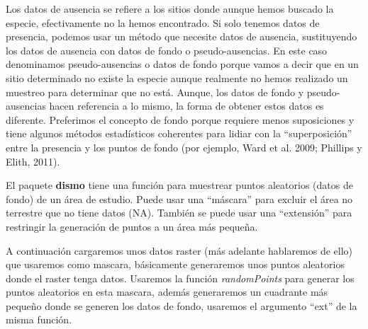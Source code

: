\documentclass[]{article}
\begin{document}
Los datos de ausencia se refiere a los sitios donde aunque hemos buscado
la especie, efectivamente no la hemos encontrado. Si solo tenemos datos
de presencia, podemos usar un método que necesite datos de ausencia,
sustituyendo los datos de ausencia con datos de fondo o
pseudo-ausencias. En este caso denominamos pseudo-ausencias o datos de
fondo porque vamos a decir que en un sitio determinado no existe la
especie aunque realmente no hemos realizado un muestreo para determinar
que no está. Aunque, los datos de fondo y pseudo-ausencias hacen
referencia a lo mismo, la forma de obtener estos datos es diferente.
Preferimos el concepto de fondo porque requiere menos suposiciones y
tiene algunos métodos estadísticos coherentes para lidiar con la
``superposición'' entre la presencia y los puntos de fondo (por ejemplo,
Ward et al. 2009; Phillips y Elith, 2011).

El paquete \textbf{dismo} tiene una función para muestrear puntos
aleatorios (datos de fondo) de un área de estudio. Puede usar una
``máscara'' para excluir el área no terrestre que no tiene datos (NA).
También se puede usar una ``extensión'' para restringir la generación de
puntos a un área más pequeña.

A continuación cargaremos unos datos raster (más adelante hablaremos de
ello) que usaremos como mascara, básicamente generaremos unos puntos
aleatorios donde el raster tenga datos. Usaremos la función
\emph{randomPoints} para generar los puntos aleatorios en esta mascara,
además generaremos un cuadrante más pequeño donde se generen los datos
de fondo, usaremos el argumento ``ext'' de la misma función.
\end{document}

